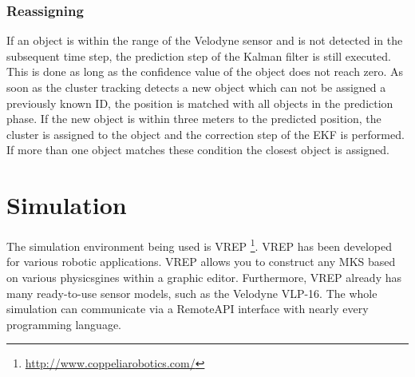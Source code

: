 \documentclass[11pt,oneside,openright]{mpreport}
\begin{document}
\subsection{Reassigning}

If an object is within the range of the Velodyne sensor and is not detected in the subsequent time step, the prediction step of the Kalman filter is still executed.
This is done as long as the confidence value of the object does not reach zero. As soon as the cluster tracking detects a new object which can not be assigned a previously known ID,
the position is matched with all objects in the prediction phase. If the new object is within three meters to the predicted position, the cluster is assigned to the object
and the correction step of the EKF is performed. If more than one object matches these condition the closest object is assigned.

\chapter{Simulation}

The simulation environment being used is VREP \footnote{\url{http://www.coppeliarobotics.com/}}. VREP has been developed for various robotic applications.
VREP allows you to construct any \ac{MKS} based on various physicsgines within a graphic editor. Furthermore, VREP already has many ready-to-use sensor models, such as
the Velodyne VLP-16. The whole simulation can communicate via a RemoteAPI interface with nearly every programming language.
\end{document}
